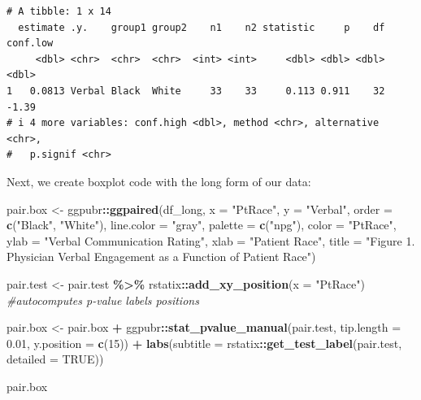\documentclass[
  11pt,
]{book}
\newenvironment{Shaded}{\begin{snugshade}}{\end{snugshade}}
\newcommand{\AttributeTok}[1]{\textcolor[rgb]{0.27,0.27,0.27}{#1}}
\newcommand{\CommentTok}[1]{\textcolor[rgb]{0.37,0.37,0.37}{\textit{#1}}}
\newcommand{\ConstantTok}[1]{\textcolor[rgb]{0.37,0.37,0.37}{#1}}
\newcommand{\DecValTok}[1]{\textcolor[rgb]{0.06,0.06,0.06}{#1}}
\newcommand{\FloatTok}[1]{\textcolor[rgb]{0.06,0.06,0.06}{#1}}
\newcommand{\FunctionTok}[1]{\textcolor[rgb]{0.27,0.27,0.27}{\textbf{#1}}}
\newcommand{\NormalTok}[1]{#1}
\newcommand{\OtherTok}[1]{\textcolor[rgb]{0.37,0.37,0.37}{#1}}
\newcommand{\SpecialCharTok}[1]{\textcolor[rgb]{0.43,0.43,0.43}{\textbf{#1}}}
\newcommand{\StringTok}[1]{\textcolor[rgb]{0.5,0.5,0.5}{#1}}
\begin{document}
\begin{verbatim}
# A tibble: 1 x 14
  estimate .y.    group1 group2    n1    n2 statistic     p    df conf.low
     <dbl> <chr>  <chr>  <chr>  <int> <int>     <dbl> <dbl> <dbl>    <dbl>
1   0.0813 Verbal Black  White     33    33     0.113 0.911    32    -1.39
# i 4 more variables: conf.high <dbl>, method <chr>, alternative <chr>,
#   p.signif <chr>
\end{verbatim}

Next, we create boxplot code with the long form of our data:

\begin{Shaded}
\begin{Highlighting}[]
\NormalTok{pair.box }\OtherTok{\textless{}{-}}\NormalTok{ ggpubr}\SpecialCharTok{::}\FunctionTok{ggpaired}\NormalTok{(df\_long, }\AttributeTok{x =} \StringTok{"PtRace"}\NormalTok{, }\AttributeTok{y =} \StringTok{"Verbal"}\NormalTok{, }\AttributeTok{order =} \FunctionTok{c}\NormalTok{(}\StringTok{"Black"}\NormalTok{,}
    \StringTok{"White"}\NormalTok{), }\AttributeTok{line.color =} \StringTok{"gray"}\NormalTok{, }\AttributeTok{palette =} \FunctionTok{c}\NormalTok{(}\StringTok{"npg"}\NormalTok{), }\AttributeTok{color =} \StringTok{"PtRace"}\NormalTok{,}
    \AttributeTok{ylab =} \StringTok{"Verbal Communication Rating"}\NormalTok{, }\AttributeTok{xlab =} \StringTok{"Patient Race"}\NormalTok{, }\AttributeTok{title =} \StringTok{"Figure 1. Physician Verbal Engagement as a Function of Patient Race"}\NormalTok{)}

\NormalTok{pair.test }\OtherTok{\textless{}{-}}\NormalTok{ pair.test }\SpecialCharTok{\%\textgreater{}\%}
\NormalTok{    rstatix}\SpecialCharTok{::}\FunctionTok{add\_xy\_position}\NormalTok{(}\AttributeTok{x =} \StringTok{"PtRace"}\NormalTok{)  }\CommentTok{\#autocomputes p{-}value labels positions}

\NormalTok{pair.box }\OtherTok{\textless{}{-}}\NormalTok{ pair.box }\SpecialCharTok{+}\NormalTok{ ggpubr}\SpecialCharTok{::}\FunctionTok{stat\_pvalue\_manual}\NormalTok{(pair.test, }\AttributeTok{tip.length =} \FloatTok{0.01}\NormalTok{,}
    \AttributeTok{y.position =} \FunctionTok{c}\NormalTok{(}\DecValTok{15}\NormalTok{)) }\SpecialCharTok{+} \FunctionTok{labs}\NormalTok{(}\AttributeTok{subtitle =}\NormalTok{ rstatix}\SpecialCharTok{::}\FunctionTok{get\_test\_label}\NormalTok{(pair.test,}
    \AttributeTok{detailed =} \ConstantTok{TRUE}\NormalTok{))}

\NormalTok{pair.box}
\end{Highlighting}
\end{Shaded}
\end{document}
